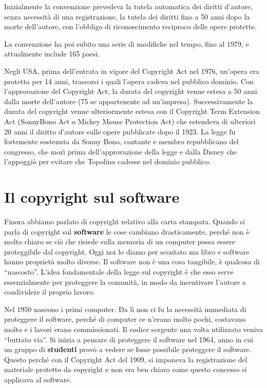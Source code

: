 Inizialmente la convenzione prevedeva la tutela automatica dei diritti d'autore, senza necessità di una registrazione, la tutela dei diritti fino a 50 anni dopo la morte dell'autore, con l'obbligo di riconoscimento reciproco delle opere protette.

La convenzione ha poi subito una serie di modifiche nel tempo, fino al 1979, e attualmente include 165 paesi. 

Negli USA, prima dell'entrata in vigore del Copyright Act nel 1976, un'opera era protetta per 14 anni, trascorsi i quali l'opera cadeva nel pubblico dominio. Con l'approvazione del Copyright Act, la durata del copyright venne estesa a 50 anni dalla morte dell'autore (75 se appartenente ad un'impresa). Successivamente la durata del copyright venne ulteriormente estesa con il Copyright Term Extension Act (SonnyBono Act o Mickey Mouse Protection Act) che estendeva di ulteriori 20 anni il diritto d'autore sulle opere pubblicate dopo il 1923. La legge fu fortemente sostenuta da Sonny Bono, cantante e membro repubblicano del congresso, che morì prima dell'approvazione della legge e dalla Disney che l'appoggiò per evitare che Topolino cadesse nel dominio pubblico.

\section{Il copyright sul software}

Finora abbiamo parlato di copyright relativo alla carta stampata. Quando si parla di copyright sul \textbf{software} le cose cambiano drasticamente, perché non è molto chiaro se ciò che risiede sulla memoria di un computer possa essere proteggibile dal copyright. 
Oggi noi lo diamo per scontato ma libro e software hanno proprietà molto diverse. Il software non è una cosa tangibile, è qualcosa di ``nascosto''. L'idea fondamentale della legge sul copyright è che esso serve essenzialmente per proteggere la comunità, in modo da incentivare l'autore a condividere il proprio lavoro. 

Nel 1950 nascono i primi computer. Da lì non ci fu la necessità immediata di proteggere il software, perché di computer ce n'erano molto pochi, costavano molto e i lavori erano commissionati. Il codice sorgente una volta utilizzato veniva ``buttato via''. 
Si inizia a pensare di proteggere il software nel 1964, anno in cui un gruppo di \textbf{studenti} provò a vedere se fosse possibile proteggere il software. Questo perché con il Copyright Act del 1909, si imponeva la registrazione del materiale protetto da copyright e non era ben chiaro come questo concesso si applicava al software.

